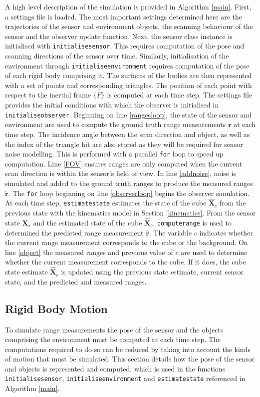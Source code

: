 A high level description of the simulation is provided in Algorithm \ref{main}.
First, a settings file is loaded. The most important settings determined here are the trajectories of the sensor and environment objects, the scanning behaviour of the sensor and the observer update function.
Next, the sensor class instance is initialised with \texttt{initialisesensor}. This requires computation of the pose and scanning directions of the sensor over time. Similarly, initialisation of the environment through \texttt{initialiseenvironment} requires computation of the pose of each rigid body comprising it. The surfaces of the bodies are then represented with a set of points and corresponding triangles. The position of each point with respect to the inertial frame $\{F\}$ is computed at each time step. The settings file provides the initial conditions with which the observer is initialised in \texttt{initialiseobserver}. 
Beginning on line \ref{rangesloop}, the state of the sensor and environment are used to compute the ground truth range measurements $\mathbf{r}$ at each time step. The incidence angle between the scan direction and object, as well as the index of the triangle hit are also stored as they will be required for sensor noise modelling. This is performed with a parallel \texttt{for} loop to speed up computation. Line \ref{FOV} ensures ranges are only computed when the current scan direction is within the sensor's field of view.
In line \ref{addnoise}, noise is simulated and added to the ground truth ranges to produce the measured ranges $\tilde{\mathbf{r}}$.
The \texttt{for} loop beginning on line \ref{observerloop} begins the observer simulation. 
At each time step, \texttt{estimatestate} estimates the state of the cube $\hat{\mathbf{X}}_c$ from the previous state with the kinematics model in Section \ref{kinematics}.
From the sensor state $\mathbf{X}_s$ and the estimated state of the cube $\hat{\mathbf{X}}_c$, \texttt{computerange} is used to determined the predicted range measurement $\hat{\mathbf{r}}$.
The variable $c$ indicates whether the current range measurement corresponds to the cube or the background. On line \ref{object} the measured ranges and previous value of $c$ are used to determine whether the current measurement corresponds to the cube. If it does, the cube state estimate $\hat{\mathbf{X}}_c$ is updated using the previous state estimate, current sensor state, and the predicted and measured ranges.


\subsection{Rigid Body Motion} \label{motion}
To simulate range measurements the pose of the sensor and the objects comprising the environment must be computed at each time step. The computations required to do so can be reduced by taking into account the kinds of motion that must be simulated. This section details how the pose of the sensor and objects is represented and computed, which is used in the functions \texttt{initialisesensor}, \texttt{initialiseenvironment} and \texttt{estimatestate} referenced in Algorithm \ref{main}.

